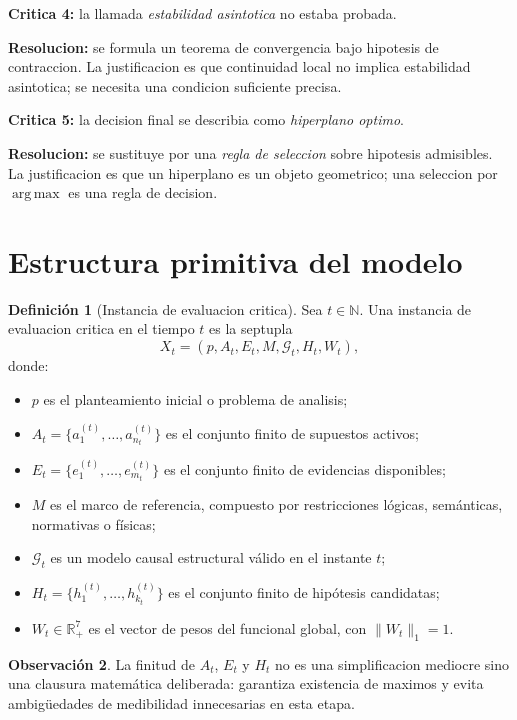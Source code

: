 \documentclass[12pt,a4paper]{article}
\newcommand{\R}{\mathbb{R}}
\newcommand{\N}{\mathbb{N}}
\newcommand{\argmax}{\operatorname*{arg\,max}}
\theoremstyle{definition}
\newtheorem{definition}{Definici\'on}[section]
\newtheorem{remark}[definition]{Observaci\'on}
\theoremstyle{plain}
\theoremstyle{remark}
\begin{document}
\textbf{Critica 4:} la llamada \emph{estabilidad asintotica} no estaba probada.

\textbf{Resolucion:} se formula un teorema de convergencia bajo hipotesis de contraccion. La justificacion es que continuidad local no implica estabilidad asintotica; se necesita una condicion suficiente precisa.

\textbf{Critica 5:} la decision final se describia como \emph{hiperplano optimo}.

\textbf{Resolucion:} se sustituye por una \emph{regla de seleccion} sobre hipotesis admisibles. La justificacion es que un hiperplano es un objeto geometrico; una seleccion por $\argmax$ es una regla de decision.

\section{Estructura primitiva del modelo}

\begin{definition}[Instancia de evaluacion critica]
Sea $t\in\N$. Una instancia de evaluacion critica en el tiempo $t$ es la septupla
\begin{equation}
X_t=(p,A_t,E_t,M,\mathcal{G}_t,H_t,W_t),
\end{equation}
donde:
\begin{itemize}[leftmargin=1.4em]
    \item $p$ es el planteamiento inicial o problema de analisis;
    \item $A_t=\{a_1^{(t)},\dots,a_{n_t}^{(t)}\}$ es el conjunto finito de supuestos activos;
    \item $E_t=\{e_1^{(t)},\dots,e_{m_t}^{(t)}\}$ es el conjunto finito de evidencias disponibles;
    \item $M$ es el marco de referencia, compuesto por restricciones l\'ogicas, sem\'anticas, normativas o f\'isicas;
    \item $\mathcal{G}_t$ es un modelo causal estructural v\'alido en el instante $t$;
    \item $H_t=\{h_1^{(t)},\dots,h_{k_t}^{(t)}\}$ es el conjunto finito de hip\'otesis candidatas;
    \item $W_t\in\R_+^7$ es el vector de pesos del funcional global, con $\|W_t\|_1=1$.
\end{itemize}
\end{definition}

\begin{remark}
La finitud de $A_t$, $E_t$ y $H_t$ no es una simplificacion mediocre sino una clausura matem\'atica deliberada: garantiza existencia de maximos y evita ambig\"uedades de medibilidad innecesarias en esta etapa.
\end{remark}
\end{document}
